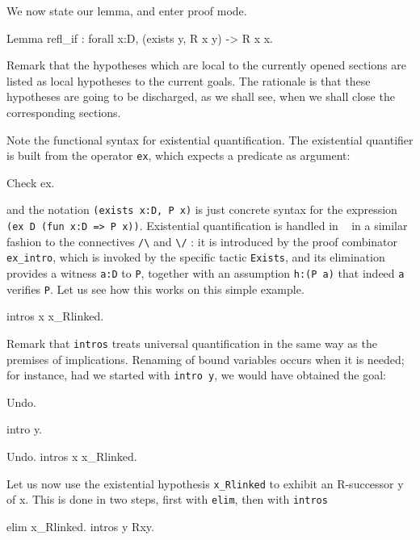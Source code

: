 \documentclass[11pt,a4paper]{book}
\begin{document}
We now state our lemma, and enter proof mode.
\begin{coq_example}
Lemma refl_if : forall x:D, (exists y, R x y) -> R x x.
\end{coq_example}

Remark that the hypotheses which are local to the currently opened sections
are listed as local hypotheses to the current goals.
The rationale is that these hypotheses are going to be discharged, as we
shall see, when we shall close the corresponding sections.

Note the functional syntax for existential quantification. The existential
quantifier is built from the operator \verb:ex:, which expects a 
predicate as argument:
\begin{coq_example}
Check ex.
\end{coq_example}
and the notation \verb+(exists x:D, P x)+ is just concrete syntax for 
the expression \verb+(ex D (fun x:D => P x))+. 
Existential quantification is handled in \Coq~ in a similar
fashion to the connectives \verb:/\: and \verb:\/: : it is introduced by
the proof combinator \verb:ex_intro:, which is invoked by the specific 
tactic \verb:Exists:, and its elimination provides a witness \verb+a:D+ to
\verb:P:, together with an assumption \verb+h:(P a)+ that indeed \verb+a+
verifies \verb:P:. Let us see how this works on this simple example.
\begin{coq_example}
intros x x_Rlinked.
\end{coq_example}

Remark that \verb:intros: treats universal quantification in the same way
as the premises of implications. Renaming of bound variables occurs
when it is needed; for instance, had we started with \verb:intro y:,
we would have obtained the goal:
\begin{coq_eval}
Undo.
\end{coq_eval}
\begin{coq_example}
intro y.
\end{coq_example}
\begin{coq_eval}
Undo.
intros x x_Rlinked.
\end{coq_eval}

Let us now use the existential hypothesis \verb:x_Rlinked: to 
exhibit an R-successor y of x. This is done in two steps, first with
\verb:elim:, then with \verb:intros:

\begin{coq_example}
elim x_Rlinked.
intros y Rxy.
\end{coq_example}
\end{document}
